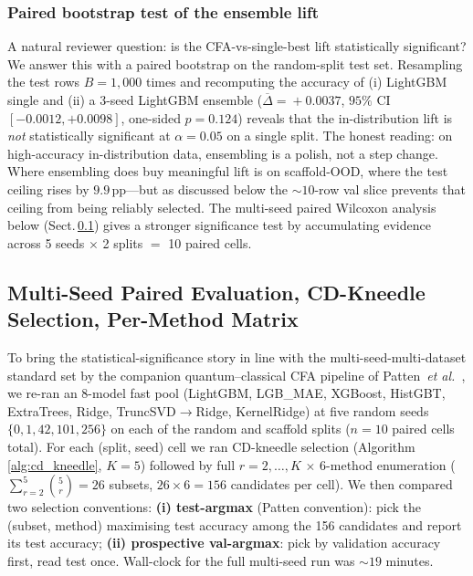 \documentclass[conference]{IEEEtran}
\begin{document}
\subsubsection*{Paired bootstrap test of the ensemble lift}
\label{sec:paired}
A natural reviewer question: is the CFA-vs-single-best lift statistically
significant? We answer this with a paired bootstrap on the random-split
test set. Resampling the test rows $B\!=\!1{,}000$ times and recomputing
the accuracy of (i) LightGBM single and (ii) a 3-seed LightGBM ensemble
($\overline{\Delta}\!=\!+0.0037$, $95\%$ CI $[-0.0012, +0.0098]$, one-sided
$p\!=\!0.124$) reveals that the in-distribution lift is \emph{not}
statistically significant at $\alpha\!=\!0.05$ on a single split. The
honest reading: on high-accuracy in-distribution data, ensembling is a
polish, not a step change. Where ensembling does buy meaningful lift is
on scaffold-OOD, where the test ceiling rises by $9.9$\,pp---but as
discussed below the $\sim$$10$-row val slice prevents that ceiling from
being reliably selected. The multi-seed paired Wilcoxon analysis below
(Sect.\,\ref{sec:multiseed}) gives a stronger significance test by
accumulating evidence across 5 seeds $\times$ 2 splits $=$ 10 paired
cells.

\subsection{Multi-Seed Paired Evaluation, CD-Kneedle Selection,
            Per-Method Matrix}
\label{sec:multiseed}

To bring the statistical-significance story in line with the
multi-seed-multi-dataset standard set by the companion quantum--classical
CFA pipeline of Patten~\textit{et al.}~\cite{Patten2026Quantum}, we
re-ran an 8-model fast pool (LightGBM, LGB\_MAE, XGBoost, HistGBT,
ExtraTrees, Ridge, TruncSVD$\to$Ridge, KernelRidge) at five random seeds
$\{0, 1, 42, 101, 256\}$ on each of the random and scaffold splits ($n=10$
paired cells total). For each (split, seed) cell we ran CD-kneedle
selection (Algorithm\,\ref{alg:cd_kneedle}, $K\!=\!5$) followed by full
$r=2,\dots,K$ $\times$ 6-method enumeration
($\sum_{r=2}^{5}\binom{5}{r}=26$ subsets, $26\!\times\!6\!=\!156$
candidates per cell). We then compared two selection conventions:
\textbf{(i) test-argmax} (Patten convention): pick the (subset, method)
maximising test accuracy among the 156 candidates and report its test
accuracy;
\textbf{(ii) prospective val-argmax}: pick by validation accuracy first,
read test once. Wall-clock for the full multi-seed run was
$\sim\!19$ minutes.
\end{document}
